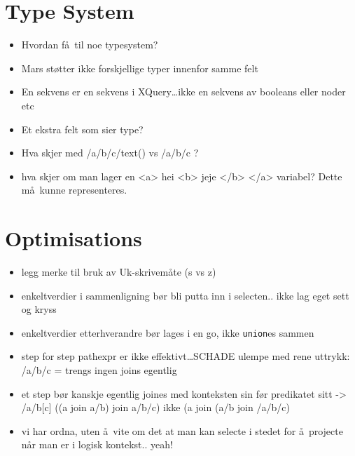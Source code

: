 \section{Type System}
\label{sect:discussion:typeSystem}
\begin{itemize}
  \item Hvordan f\aa~til noe typesystem?
  \item Mars st\o tter ikke forskjellige typer innenfor samme felt
  \item En sekvens er en sekvens i XQuery\ldots ikke en sekvens av booleans
  eller noder etc
  \item Et ekstra felt som sier type?
  \item Hva skjer med /a/b/c/text() vs /a/b/c ?
  \item hva skjer om man lager en <a> hei <b> jeje </b> </a> variabel? Dette
  m\aa~kunne representeres.
\end{itemize}

\section{Optimisations}
\label{sect:discussion:optimisations}
\begin{itemize}
  \item legg merke til bruk av Uk-skrivem\aa te (s vs z)
  \item enkeltverdier i sammenligning b\o r bli putta inn i selecten.. ikke lag
  eget sett og kryss
  \item enkeltverdier etterhverandre b\o r lages i en go, ikke \texttt{union}es
  sammen
  \item step for step pathexpr er ikke effektivt\ldots SCHADE ulempe med rene uttrykk: /a/b/c = trengs ingen
  joins egentlig
  \item et step b\o r kanskje egentlig joines med konteksten sin f\o r predikatet sitt -> /a/b[c] ((a join a/b)
  join a/b/c) ikke (a join (a/b join /a/b/c)
  \item vi har ordna, uten \aa~vite om det at man kan selecte i stedet for \aa~projecte n\aa r man er i logisk
  kontekst.. yeah!
\end{itemize}